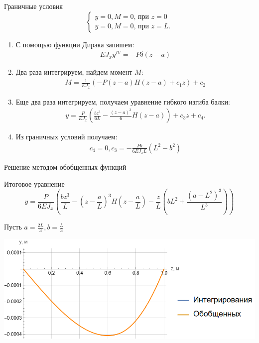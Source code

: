 \documentclass[ignoreonframetext,unicode]{beamer}
\begin{document}
\begin{frame}{}
	\vspace*{-2.0mm}
	\begin{block}{Граничные условия}
		\[
		\begin{cases}
			y = 0, M = 0 \mbox{, при } z = 0\\
			y = 0, M = 0 \mbox{, при } z = L.
		\end{cases}
		\]		
	\end{block}
	
	\begin{enumerate}
		\item С помощью функции Дирака запишем: 
		\begin{gather*}
		E J_{x} y^{IV} = - P \delta \left(z - a\right)
		\end{gather*}
		
		\item Два раза интегрируем, найдем момент $M$:
		\begin{gather*}
			\label{z121334}
			M = \frac{1}{E J_{x}} \left( - P \left(z - a\right) H \left(z - a\right) + c_1 z \right) + c_2
		\end{gather*}
		
		\item Еще два раза интегрируем, получаем уравнение гибкого изгиба балки:
		\begin{gather*}
			y = \frac{P}{E J_{x}}
			\left(\frac{b z^3}{6 L} -
			\frac{\left(z - a\right)^3}{6} H \left(z - a\right) \right)
			+ c_3 z + c_4.
		\end{gather*}
	
		\item Из граничных условий получаем:
		\begin{gather*}
			c_4 = 0, c_3 =  - \frac {P b} {6 E J_{x} L} \left(L^{2} - b^2\right)
		\end{gather*}
		
	\end{enumerate}
\end{frame}

\begin{frame}{Решение методом обобщенных функций}
	
		\begin{block}{Итоговое уравнение}	
			\[
			y = \frac{P}{6 E J_{x}} \left(\frac{b z^3}{L} - \left(z - \frac{a}{L}\right)^3 H\left(z - \frac{a}{L}\right) - \frac{z}{L} \left(b L^{2} + \frac{(a - L^2)^3}{L^3} \right) \right)
			\]
		\end{block}
		Пусть $a = \frac{2 L}{3}, b = \frac{L}{3}$

		\includegraphics[width=1\textwidth]{g.4}

\end{frame}
\end{document}
